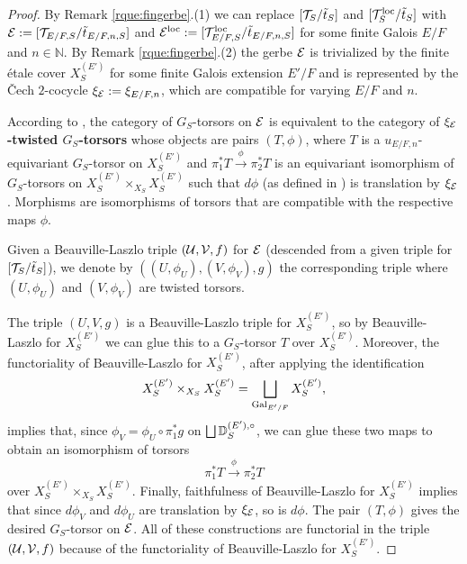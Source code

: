 \begin{proof}
By Remark \ref{rque:fingerbe}.(1) we can replace $[\mathcal{T}_{S}/\tilde{t}_{S}]$ and $[\mathcal{T}_{S}^{\mathrm{loc}}/\tilde{t}_{S}]$ with $\mathcal{E}:=[\mathcal{T}_{E/F,S}/\tilde{t}_{E/F,n,S}]$ and $\mathcal{E}^{\mathrm{loc}} := [\mathcal{T}_{E/F,S}^{\mathrm{loc}}/\tilde{t}_{E/F,n,S}]$ for some finite Galois $E/F$ and $n \in \mathbb{N}$. By Remark \ref{rque:fingerbe}.(2) the gerbe $\mathcal{E}$ is trivialized by the finite \'{e}tale cover $X_{S}^{(E')}$ for some finite Galois extension $E'/F$ and is represented by the \v{C}ech $2$-cocycle $\xi_{\mathcal{E}} := \xi_{E/F,n}$, which are compatible for varying $E/F$ and $n$.

According to \cite[Proposition 2.50]{Dillery23}, the category of $G_{S}$-torsors on $\mathcal{E}$ is equivalent to the category of \textbf{$\xi_{\mathcal{E}}$-twisted $G_{S}$-torsors} whose objects are pairs $(T,\phi)$, where $T$ is a $u_{E/F,n}$-equivariant $G_{S}$-torsor on $X_{S}^{(E')}$ and $\pi_{1}^{*}T \xrightarrow{\phi} \pi_{2}^{*}T$ is an equivariant isomorphism of $G_{S}$-torsors on $X_{S}^{(E')} \times_{X_{S}} X_{S}^{(E')}$ such that $d\phi$ (as defined in \cite[Lemma 2.37]{Dillery23}) is translation by $\xi_{\mathcal{E}}$. Morphisms are isomorphisms of torsors that are compatible with the respective maps $\phi$.

Given a Beauville-Laszlo triple $(\mathcal{U},\mathcal{V},f)$ for $\mathcal{E}$ (descended from a given triple for $[\mathcal{T}_{S}/\tilde{t}_{S}]$), we denote by $((U,\phi_{U}),(V,\phi_{V}),g)$ the corresponding triple where $(U,\phi_{U})$ and $(V,\phi_{V})$ are twisted torsors.

The triple $(U,V,g)$ is a Beauville-Laszlo triple for $X_{S}^{(E')}$, so by Beauville-Laszlo for $X_{S}^{(E')}$ we can glue this to a $G_{S}$-torsor $T$ over $X_{S}^{(E')}$. Moreover, the functoriality of Beauville-Laszlo for $X_{S}^{(E')}$, after applying the identification 
\begin{equation*}
X_{S}^{(E')} \times_{X_{S}} X_{S}^{(E')} = \bigsqcup_{\mathrm{Gal}_{E'/F}} X_{S}^{(E')},
\end{equation*}
implies that, since $\phi_{V} = \phi_{U} \circ \pi_{1}^{*}g$ on $\bigsqcup\mathbb D_{S}^{(E'),\circ}$, we can glue these two maps to obtain an isomorphism of torsors 
\begin{equation*}
    \pi_{1}^{*}T \xrightarrow{\phi} \pi_{2}^{*}T
\end{equation*}
over $X_{S}^{(E')} \times_{X_{S}} X_{S}^{(E')}$. Finally, faithfulness of Beauville-Laszlo for $X_{S}^{(E')}$ implies that since $d\phi_{V}$ and $d\phi_{U}$ are translation by $\xi_{\mathcal{E}}$, so is $d\phi$. The pair $(T,\phi)$ gives the desired $G_{S}$-torsor on $\mathcal{E}$. All of these constructions are functorial in the triple $(\mathcal{U},\mathcal{V},f)$ because of the functoriality of Beauville-Laszlo for $X_{S}^{(E')}$. 
\end{proof}

